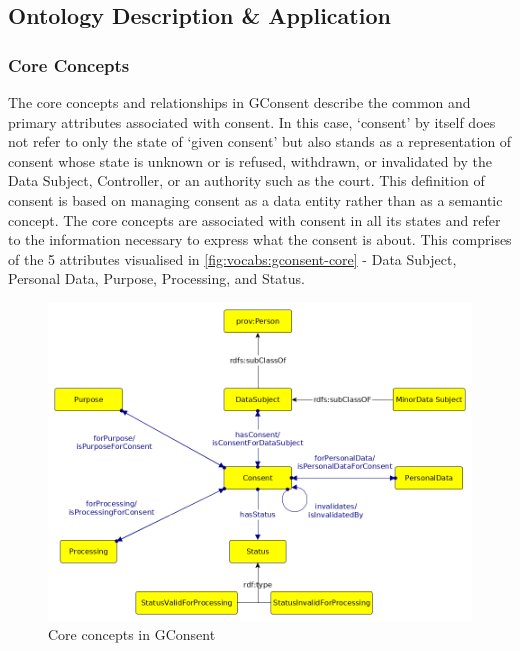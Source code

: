 \subsection{Ontology Description \& Application}
\subsubsection{Core Concepts}
The core concepts and relationships in GConsent describe the common and primary attributes associated with consent.
In this case, `consent' by itself does not refer to only the state of `given consent' but also stands as a representation of consent whose state is unknown or is refused, withdrawn, or invalidated by the Data Subject, Controller, or an authority such as the court. This definition of consent is based on managing consent as a data entity rather than as a semantic concept. 
The core concepts are associated with consent in all its states and refer to the information necessary to express what the consent is about. This comprises of the 5 attributes visualised in \autoref{fig:vocabs:gconsent-core} - Data Subject, Personal Data, Purpose, Processing, and Status.
\begin{figure}[htbp]
    \centering
    \includegraphics[width=0.8\linewidth]{img/gconsent_core.png}
    \caption{Core concepts in GConsent \cite{}}
    \label{fig:vocabs:gconsent-core}
\end{figure}

